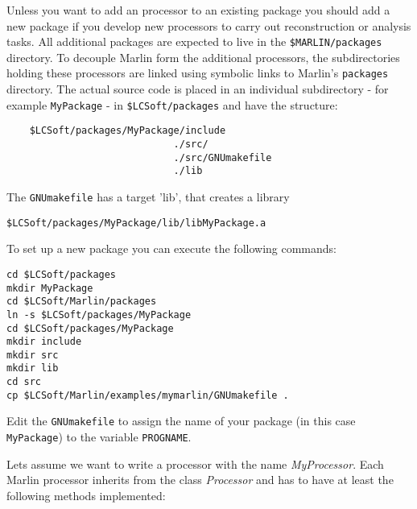 Unless you want to add an processor to an existing package you should add a
new package if you develop new processors to carry out reconstruction or
analysis tasks. All additional packages are expected to live in the
{\tt \$MARLIN/packages} directory.
To decouple Marlin form the additional processors, the subdirectories holding
these processors are linked using symbolic links to Marlin's {\tt packages}
directory. The actual source code is placed in an individual
subdirectory - for example {\tt MyPackage} - in {\tt \$LCSoft/packages}
and have the structure:

\begin{verbatim}
    $LCSoft/packages/MyPackage/include
                             ./src/
                             ./src/GNUmakefile
                             ./lib
\end{verbatim}

The {\tt GNUmakefile} has a target 'lib', that creates a library

\begin{verbatim}
$LCSoft/packages/MyPackage/lib/libMyPackage.a
\end{verbatim}

To set up a new package you can execute the following commands:

\begin{verbatim}
cd $LCSoft/packages
mkdir MyPackage
cd $LCSoft/Marlin/packages
ln -s $LCSoft/packages/MyPackage
cd $LCSoft/packages/MyPackage
mkdir include
mkdir src
mkdir lib
cd src
cp $LCSoft/Marlin/examples/mymarlin/GNUmakefile .
\end{verbatim}

Edit the {\tt GNUmakefile} to assign the name of your package
(in this case {\tt MyPackage}) to the variable {\tt PROGNAME}.

Lets assume we want to write a processor with the name
{\em MyProcessor}.
Each Marlin processor inherits from the class {\em Processor} and has to have
at least the following methods implemented:

